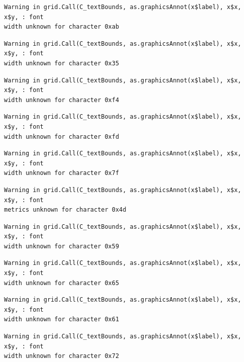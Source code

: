 \documentclass[
  letterpaper,
  DIV=11,
  numbers=noendperiod]{scrreprt}
\begin{document}
\begin{verbatim}
Warning in grid.Call(C_textBounds, as.graphicsAnnot(x$label), x$x, x$y, : font
width unknown for character 0xab
\end{verbatim}

\begin{verbatim}
Warning in grid.Call(C_textBounds, as.graphicsAnnot(x$label), x$x, x$y, : font
width unknown for character 0x35
\end{verbatim}

\begin{verbatim}
Warning in grid.Call(C_textBounds, as.graphicsAnnot(x$label), x$x, x$y, : font
width unknown for character 0xf4
\end{verbatim}

\begin{verbatim}
Warning in grid.Call(C_textBounds, as.graphicsAnnot(x$label), x$x, x$y, : font
width unknown for character 0xfd
\end{verbatim}

\begin{verbatim}
Warning in grid.Call(C_textBounds, as.graphicsAnnot(x$label), x$x, x$y, : font
width unknown for character 0x7f
\end{verbatim}

\begin{verbatim}
Warning in grid.Call(C_textBounds, as.graphicsAnnot(x$label), x$x, x$y, : font
metrics unknown for character 0x4d
\end{verbatim}

\begin{verbatim}
Warning in grid.Call(C_textBounds, as.graphicsAnnot(x$label), x$x, x$y, : font
width unknown for character 0x59
\end{verbatim}

\begin{verbatim}
Warning in grid.Call(C_textBounds, as.graphicsAnnot(x$label), x$x, x$y, : font
width unknown for character 0x65
\end{verbatim}

\begin{verbatim}
Warning in grid.Call(C_textBounds, as.graphicsAnnot(x$label), x$x, x$y, : font
width unknown for character 0x61
\end{verbatim}

\begin{verbatim}
Warning in grid.Call(C_textBounds, as.graphicsAnnot(x$label), x$x, x$y, : font
width unknown for character 0x72
\end{verbatim}
\end{document}

